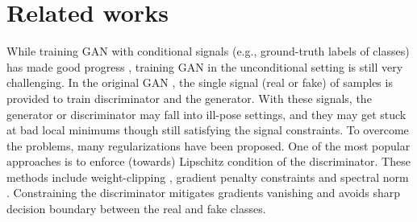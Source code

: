 \documentclass{article}
\begin{document}
 
\section{Related works}

While training GAN with conditional signals (e.g., ground-truth labels of classes) has made good progress \cite{odena-icml-2017,zhang-arxiv-2018,brock-iclr-2018}, training GAN in the unconditional setting is still very challenging. In the original GAN \cite{goodfellow-nisp-2014}, the single signal (real or fake) of samples is provided to train discriminator and the generator. With these signals, the generator or discriminator may fall into ill-pose settings, and they may get stuck at bad local minimums though still satisfying the signal constraints. To overcome the problems, many regularizations have been proposed. One of the most popular approaches is to enforce (towards) Lipschitz condition of the discriminator. These methods include weight-clipping \cite{arjovsky-arxiv-2017a}, gradient penalty constraints \cite{gulrajani-arxiv-2017,roth-nips-2017,kodali-arxiv-2017,petzka-arxiv-2017,liu-arxiv-2018} and spectral norm \cite{miyato-iclr-2018}. Constraining the discriminator mitigates gradients vanishing and avoids sharp decision boundary between the real and fake classes. 
\end{document}
